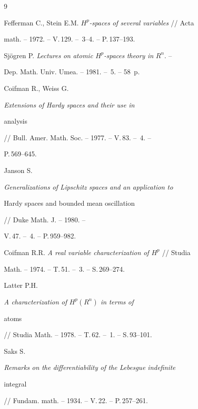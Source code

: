 \begin{thebibliography}{9}







Fefferman C., Stein E.M. {\em $H^p$-spaces of several variables} // Acta


math. -- 1972. -- V.\,129. -- \No\,3--4. -- P.\,137--193.




Sj\"ogren P. {\em Lectures on atomic $H^p$-spaces theory in $R^n$}. --


Dep. Math. Univ. Umea. -- 1981. -- \No\,5. -- 58~p.




Coifman R., Weiss G. {\em Extensions of Hardy spaces and their use in


analysis} // Bull. Amer. Math. Soc. -- 1977. -- V.\,83. -- \No\,4. --


P.\,569--645.




Janson S. {\em Generalizations of Lipschitz spaces and an application to


Hardy spaces and bounded mean oscillation} // Duke Math. J. -- 1980. --


V.\,47. -- \No\,4. -- P.\,959--982.




Coifman R.R. {\em A real variable characterization of $H^p$} // Studia


Math. -- 1974. -- T.\,51. -- \No\,3. -- S.\,269--274.




Latter P.H. {\em A characterization of $H^p(R^n)$ in terms of


atoms} // Studia Math. -- 1978. -- T.\,62. -- \No\,1. -- S.\,93--101.




Saks S. {\em Remarks on the differentiability of the Lebesgue indefinite


integral} // Fundam. math. -- 1934. -- V.\,22. -- P.\,257--261.








\end{thebibliography}





\vskip 2cm












\label{end}





